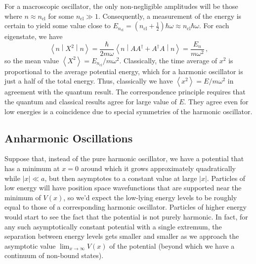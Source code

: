 \documentclass{article}
\theoremstyle{plain}\theoremheaderfont{\normalfont\itshape}\theorembodyfont{\rmfamily}\theoremseparator{.}\newtheorem*{rem}{Remark}\newtheorem*{ex}{Example}\newtheorem*{proof}{Proof}\newtheorem*{altp}{Alternative proof}
\theoremstyle{plain}\theoremheaderfont{\normalfont\bfseries}\theorembodyfont{\rmfamily}\theoremseparator{.}\newtheorem{thm}{Theorem}[section]\newtheorem{lem}[thm]{Lemma}\newtheorem{prop}[thm]{Proposition}\newtheorem*{cor}{Corollary}\newtheorem{defn}[thm]{Definition}\newtheorem{clm}[thm]{Claim}\newtheorem{clminproof}{Claim}
\theoremstyle{break}\theoremheaderfont{\normalfont\itshape}\theorembodyfont{\rmfamily}\theoremseparator{.\medskip}\newtheorem*{proofskip}{Proof}\newtheorem*{exs}{Examples}\newtheorem*{rems}{Remarks}
\theoremstyle{break}\theoremheaderfont{\normalfont\bfseries}\theorembodyfont{\rmfamily}\theoremseparator{.\medskip}\newtheorem{lemskip}[thm]{Lemma}\newtheorem{defnskip}[thm]{Definition}\newtheorem{propskip}[thm]{Proposition}\newtheorem{thmskip}[thm]{Theorem}
\numberwithin{equation}{section}
\newcommand{\eval}[1]{\left\langle #1 \right\rangle}
\newcommand{\expval}[2]{\left\langle #2 \middle| #1 \middle| #2 \right\rangle}
\newcommand{\abs}[1]{\left| #1 \right|}
\begin{document}
    For a macroscopic oscillator, the only non-negligible amplitudes will be those where \(n\approx n_{\text{cl}}\) for some \(n_{\text{cl}}\gg 1\). Consequently, a measurement of the energy is certain to yield some value close to \(E_{n_{\text{cl}}}=(n_{\text{cl}}+\frac{1}{2})\hbar\omega\approx n_{\text{cl}}\hbar\omega\). For each eigenstate, we have
    \begin{equation}
        \expval{X^2}{n}=\frac{\hbar}{2m\omega}\expval{AA^\dagger+A^\dagger A}{n}=\frac{E_n}{m\omega^2}\,,
    \end{equation}
    so the mean value \(\eval{X^2}=E_{n_\text{cl}}/m\omega^2\). Classically, the time average of \(x^2\) is proportional to the average potential energy, which for a harmonic oscillator is just a half of the total energy. Thus, classically we have \(\eval{x^2}=E/m\omega^2\) in agreement with the quantum result. The correspondence principle requires that the quantum and classical results agree for large value of \(E\). They agree even for low energies is a coincidence due to special symmetries of the harmonic oscillator.
    \subsection{Anharmonic Oscillations}
    Suppose that, instead of the pure harmonic oscillator, we have a potential that has a minimum at \(x=0\) around which it grows approximately quadratically while \(\abs{x}\ll a\), but then asymptotes to a constant value at large \(\abs{x}\). Particles of low energy will have position space wavefunctions that are supported near the minimum of \(V(x)\), so we'd expect the low-lying energy levels to be roughly equal to those of a corresponding harmonic oscillator. Particles of higher energy would start to see the fact that the potential is not purely harmonic. In fact, for any such asymptotically constant potential with a single extremum, the separation between energy levels gets smaller and smaller as we approach the asymptotic value \(\lim_{x\to\infty}V(x)\) of the potential (beyond which we have a continuum of non-bound states).
\end{document}

